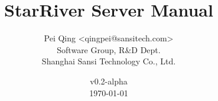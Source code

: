 \title{\textbf{StarRiver Server Manual}}

\author{Pei Qing <qingpei@sansitech.com> \\
        Software Group, R\&D Dept.\\
        Shanghai Sansi Technology Co., Ltd.
}

\date{\vspace{3em} v0.2-alpha \\\vspace{3em} \today}
